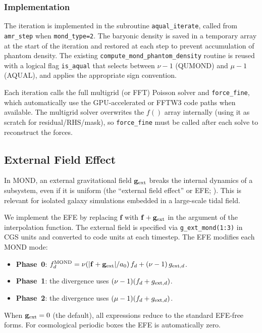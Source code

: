 \documentclass[fleqn,usenatbib]{mnras}
\newcommand{\code}[1]{\texttt{#1}}
\newcommand{\azero}{a_0}
\begin{document}
\subsubsection{Implementation}

The iteration is implemented in the subroutine \code{aqual\_iterate},
called from \code{amr\_step} when \code{mond\_type=2}.  The
baryonic density is saved in a temporary array at the start of the
iteration and restored at each step to prevent accumulation of
phantom density.  The existing \code{compute\_mond\_phantom\_density}
routine is reused with a logical flag \code{is\_aqual} that selects
between $\nu - 1$ (QUMOND) and $\mu - 1$ (AQUAL), and applies the
appropriate sign convention.

Each iteration calls the full multigrid (or FFT) Poisson solver and
\code{force\_fine}, which automatically use the GPU-accelerated or
FFTW3 code paths when available.  The multigrid solver overwrites
the $f()$ array internally (using it as scratch for
residual/RHS/mask), so \code{force\_fine} must be called after each
solve to reconstruct the forces.

\subsection{External Field Effect}
\label{sec:mond_efe}

In MOND, an external gravitational field $\mathbf{g}_{\rm ext}$
breaks the internal dynamics of a subsystem, even if it is
uniform (the ``external field effect'' or EFE;
\citealt{Milgrom1983,Bekenstein1984}).  This is relevant for
isolated galaxy simulations embedded in a large-scale tidal field.

We implement the EFE by replacing $\mathbf{f}$ with
$\mathbf{f} + \mathbf{g}_{\rm ext}$ in the argument of the
interpolation function.  The external field is specified via
\code{g\_ext\_mond(1:3)} in CGS units and converted to code
units at each timestep.  The EFE modifies each MOND mode:
\begin{itemize}
\item \textbf{Phase~0}: $f_d^{\rm MOND} = \nu(|\mathbf{f}+
  \mathbf{g}_{\rm ext}|/\azero)\,f_d + (\nu - 1)\,g_{{\rm ext},d}$.
\item \textbf{Phase~1}: the divergence uses $(\nu-1)
  (f_d + g_{{\rm ext},d})$.
\item \textbf{Phase~2}: the divergence uses $(\mu-1)
  (f_d + g_{{\rm ext},d})$.
\end{itemize}
When $\mathbf{g}_{\rm ext} = 0$ (the default), all expressions reduce
to the standard EFE-free forms.  For cosmological periodic boxes the
EFE is automatically zero.
\end{document}
